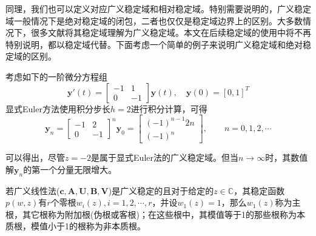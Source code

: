 同理，我们也可以定义对应广义稳定域和相对稳定域。特别需要说明的，广义稳定域一般情况下是绝对稳定域的闭包，二者也仅仅是稳定域边界上的区别。大多数情况下，很多文献将其稳定域理解为广义稳定域。本文在后续稳定域的使用中将不再特别说明，都以稳定域代替。下面考虑一个简单的例子\cite{LiShouFo2010a}来说明广义稳定域和绝对稳定域的区别。

考虑如下的一阶微分方程组
\begin{equation}
\bm{y}'(t)=\begin{bmatrix}
-1 & 1\\ 0 & -1
\end{bmatrix}\bm{y}(t),\quad \bm{y}(0)=[0,1]^T
\end{equation}
显式Euler方法使用积分步长$h=2$进行积分计算，可得
\begin{equation}
\bm{y}_n=\begin{bmatrix}
-1 & 2\\ 0 & -1
\end{bmatrix}^n\bm{y}_0=\begin{bmatrix}
(-1)^{n-1}2n\\ (-1)^n
\end{bmatrix},\qquad n=0,1,2,\cdots
\end{equation}

可以得出，尽管$z=-2$是属于显式Euler法的广义稳定域。但当$n\to\infty$时，其数值解$\bm{y}_n$的第一个分量无限增大。

\begin{definition}
若广义线性法($\bm{c},\bm{A},\bm{U},\bm{B},\bm{V}$)是广义稳定的且对于给定的$z\in\mathbb{C}$，其稳定函数$p(w,z)$有$r$个零根$w_i(z),i=1,2,\cdots,r$，并设$w_1(z)=1$，那么$w_1(z)$称为主根，其它根称为附加根(伪根或客根)；在这些根中，其模值等于1的那些根称为本质根，模值小于1的根称为非本质根\cite{LiShouFo2010a}。
\end{definition}

